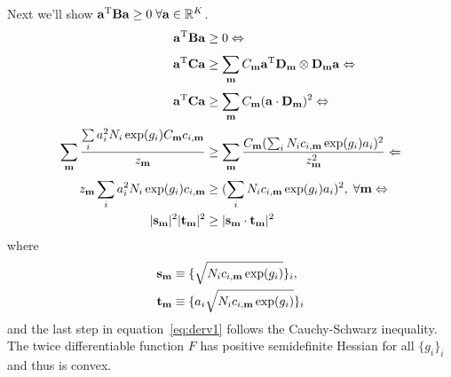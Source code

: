 Next we'll show $\mathbf{a}^{\mathrm{T}} \mathbf{B} \mathbf{a} \ge 0\;\forall \mathbf{a} \in \mathbb{R}^{K}$.
\begin{align}
\mathbf{a}^{\mathrm{T}} \mathbf{B} \mathbf{a} &\ge 0 \Leftrightarrow \notag \\
\mathbf{a}^{\mathrm{T}} \mathbf{C} \mathbf{a} &\ge \sum_{\mathbf{m}}^{} C_{\mathbf{m}}  \mathbf{a}^{\mathrm{T}} \mathbf{D}_{\mathbf{m}} \otimes \mathbf{D}_{\mathbf{m}} \mathbf{a}  \Leftrightarrow \notag \\
\mathbf{a}^{\mathrm{T}} \mathbf{C} \mathbf{a} &\ge \sum_{\mathbf{m}}^{} C_{\mathbf{m}} (\mathbf{a} \cdot \mathbf{D}_{\mathbf{m}})^2 \Leftrightarrow \notag \\
\sum_{\mathbf{m}}^{} \frac{\sum\limits_{i}^{} a_{i}^{2} N_{i} \exp(g_{i}) C_{\mathbf{m}} c_{i,\mathbf{m}}}{z_{\mathbf{m}}} &\ge  
\sum_{\mathbf{m}}^{} \frac{C_{\mathbf{m}}(\sum_{i}^{} N_{i} c_{i,\mathbf{m}} \exp(g_{i}) a_{i})^{2}}{z_{\mathbf{m}}^{2}} \Leftarrow \notag \\
z_{\mathbf{m}} \sum\limits_{i}^{} a_{i}^{2} N_{i} \exp(g_{i}) c_{i,\mathbf{m}} &\ge  
(\sum_{i}^{} N_{i} c_{i,\mathbf{m}} \exp(g_{i}) a_{i})^{2}, \;\forall \mathbf{m} \Leftrightarrow \notag \\
\lvert\mathbf{\mathbf{s}_{\mathbf{m}}}\rvert^{2} \lvert\mathbf{\mathbf{t}_{\mathbf{m}}}\rvert^{2} &\ge \lvert\mathbf{\mathbf{s}_{\mathbf{m}} \cdot \mathbf{t}_{\mathbf{m}}}\rvert^{2}  
\label{eq:derv1}
\end{align}
where
\begin{align}
\mathbf{s}_{\mathbf{m}} &\equiv \{\sqrt{N_{i} c_{i,\mathbf{m}} \exp(g_{i})}\}_{i}, \notag \\
\mathbf{t}_{\mathbf{m}} &\equiv \{a_{i} \sqrt{N_{i} c_{i,\mathbf{m}} \exp(g_{i})}\}_{i}
\label{eq:derv2}
\end{align}
and the last step in equation~\ref{eq:derv1} follows the Cauchy-Schwarz inequality.  
The twice differentiable function $F$ has positive semidefinite Hessian for all $\{g_{i}\}_{i}$ 
and thus is convex.
